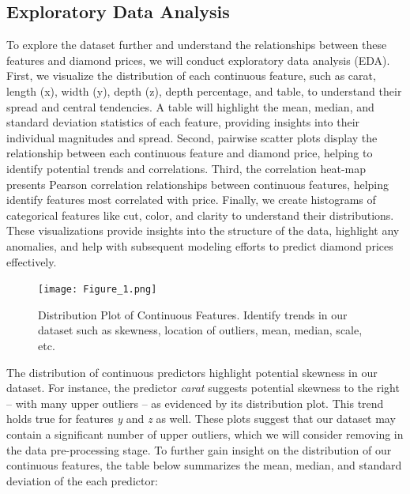 \documentclass[conference]{IEEEtran}
\begin{document}
\subsection{Exploratory Data Analysis}

To explore the dataset further and understand the relationships between these features and diamond prices, we will conduct exploratory data analysis (EDA). First, we visualize the distribution of each continuous feature, such as carat, length (x), width (y), depth (z), depth percentage, and table, to understand their spread and central tendencies. A table will highlight the mean, median, and standard deviation statistics of each feature, providing insights into their individual magnitudes and spread. Second, pairwise scatter plots display the relationship between each continuous feature and diamond price, helping to identify potential trends and correlations. Third, the correlation heat-map presents Pearson correlation relationships between continuous features, helping identify features most correlated with price. Finally, we create histograms of categorical features like cut, color, and clarity to understand their distributions. These visualizations provide insights into the structure of the data, highlight any anomalies, and help with subsequent modeling efforts to predict diamond prices effectively.

\begin{figure}[H]
    \centering
    \texttt{[image: Figure\_1.png]}
    \caption{Distribution Plot of Continuous Features. Identify trends in our dataset such as skewness, location of outliers, mean, median, scale, etc.}
    \label{fig:image_label}
\end{figure}

The distribution of continuous predictors highlight potential skewness in our dataset. For instance, the predictor \emph{carat} suggests potential skewness to the right – with many upper outliers – as evidenced by its distribution plot. This trend holds true for features \emph{y} and \emph{z} as well. These plots suggest that our dataset may contain a significant number of upper outliers, which we will consider removing in the data pre-processing stage. To further gain insight on the distribution of our continuous features, the table below summarizes the mean, median, and standard deviation of the each predictor:
\end{document}
